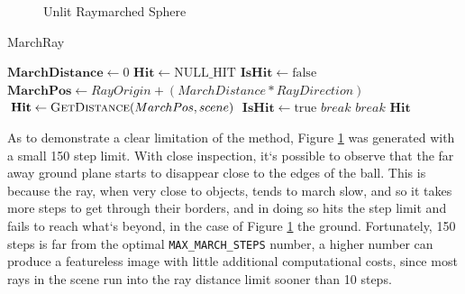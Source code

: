 \begin{figure}[ht]
    \centering
    \caption{Unlit Raymarched Sphere}
    \label{fig:unlit_march_sphere}
\end{figure}

\begin{algorithm}[H]
\caption{MarchRay}
\label{alg:marchray}
\begin{algorithmic}[1]
    \State $ \mathbf{MarchDistance} \gets \text{0} $
    \State $ \mathbf{Hit} \gets \text{NULL\_HIT} $
    \State $ \mathbf{IsHit} \gets \text{false} $
        \State $\mathbf{MarchPos} \gets  RayOrigin+ (MarchDistance * RayDirection) $
        \State $\mathbf{Hit} \gets \Call{GetDistance}{MarchPos, scene}$
            \State $ \mathbf{IsHit} \gets \text{true} $
            \State $ break $
        \EndIf
            \State $ break $
        \EndIf
    \EndFor
    \State \Return $\mathbf{Hit}$
\EndProcedure
\end{algorithmic}
\end{algorithm}

As to demonstrate a clear limitation of the method, Figure \ref{fig:unlit_march_sphere} was generated with a small 150 step limit. With close inspection, it`s possible to observe that the far away ground plane starts to disappear close to the edges of the ball. This is because the ray, when very close to objects, tends to march slow, and so it takes more steps to get through their borders, and in doing so hits the step limit and fails to reach what`s beyond, in the case of Figure \ref{fig:unlit_march_sphere} the ground. Fortunately, 150 steps is far from the optimal \texttt{MAX\_MARCH\_STEPS} number, a higher number can produce a featureless image with little additional computational costs, since most rays in the scene run into the ray distance limit sooner than 10 steps.


